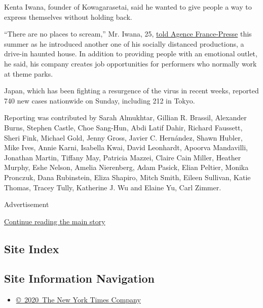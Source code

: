 Kenta Iwana, founder of Kowagarasetai, said he wanted to give people a
way to express themselves without holding back.

``There are no places to scream,'' Mr. Iwana, 25,
\href{https://edition.cnn.com/travel/article/tokyo-drive-in-haunted-house-kowagarasetai/index.html}{told
Agence France-Presse} this summer as he introduced another one of his
socially distanced productions, a drive-in haunted house. In addition to
providing people with an emotional outlet, he said, his company creates
job opportunities for performers who normally work at theme parks.

Japan, which has been fighting a resurgence of the virus in recent
weeks, reported 740 new cases nationwide on Sunday, including 212 in
Tokyo.

Reporting was contributed by Sarah Almukhtar, Gillian R. Brassil,
Alexander Burns, Stephen Castle, Choe Sang-Hun, Abdi Latif Dahir,
Richard Faussett, Sheri Fink, Michael Gold, Jenny Gross, Javier C.
Hernández, Shawn Hubler, Mike Ives, Annie Karni, Isabella Kwai, David
Leonhardt, Apoorva Mandavilli, Jonathan Martin, Tiffany May, Patricia
Mazzei, Claire Cain Miller, Heather Murphy, Eshe Nelson, Amelia
Nierenberg, Adam Pasick, Elian Peltier, Monika Pronczuk, Dana
Rubinstein, Eliza Shapiro, Mitch Smith, Eileen Sullivan, Katie Thomas,
Tracey Tully, Katherine J. Wu and Elaine Yu, Carl Zimmer.

Advertisement

\protect\hyperlink{after-bottom}{Continue reading the main story}

\hypertarget{site-index}{%
\subsection{Site Index}\label{site-index}}

\hypertarget{site-information-navigation}{%
\subsection{Site Information
Navigation}\label{site-information-navigation}}

\begin{itemize}
\tightlist
\item
  \href{https://help.nytimes3xbfgragh.onion/hc/en-us/articles/115014792127-Copyright-notice}{©~2020~The
  New York Times Company}
\end{itemize}

